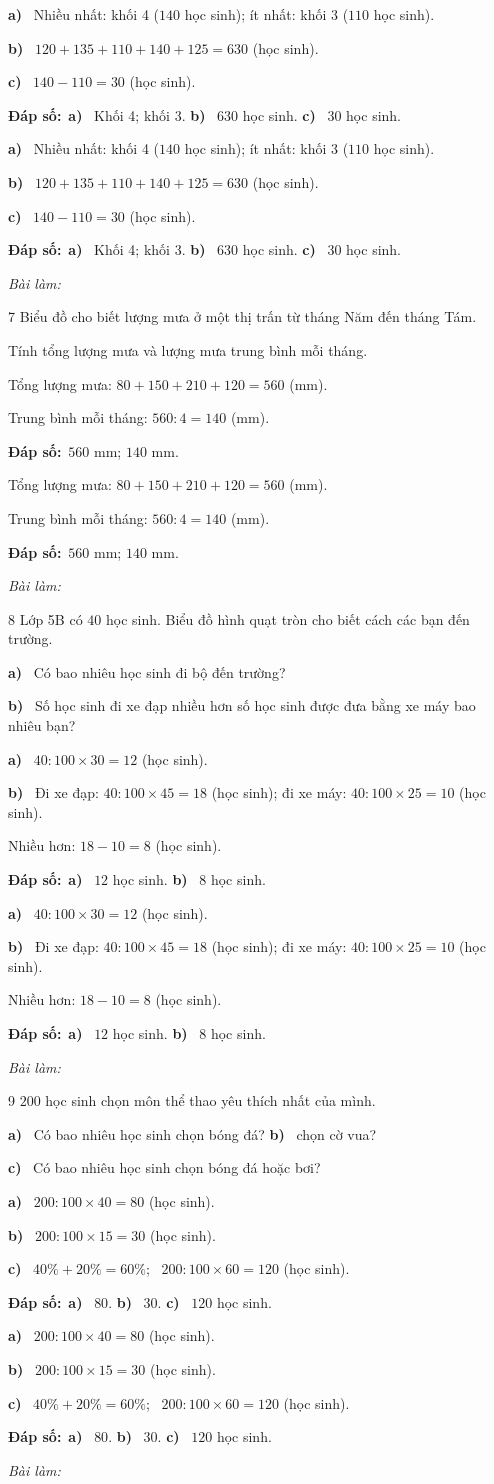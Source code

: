 \documentclass[11pt]{article}
\newif\ifsol \soltrue
\providecommand{\AnsWord}{Đáp số}
\newcommand{\dapso}[1]{\par\textbf{\AnsWord:}\ #1}
\newcommand{\probsol}[1]{%
  \begin{lrbox}{\solmeasure}\begin{minipage}{\dimexpr\linewidth-24pt\relax}#1\end{minipage}\end{lrbox}%
  \ifsol
    \begin{solbox}#1\end{solbox}%
  \else
    \setlength{\solht}{\dimexpr\ht\solmeasure+\dp\solmeasure+0.85cm\relax}%
    \ifdim\solht<1.35cm\setlength{\solht}{1.35cm}\fi
    \begin{tcolorbox}[colback=white,colframe=Line,boxrule=0.8pt,arc=5pt,
      left=8pt,right=8pt,top=4pt,bottom=4pt,height=\solht]{\footnotesize\color{Slate}\itshape\WorkWord}\end{tcolorbox}%
  \fi}
\newcommand{\pa}[1]{\textbf{#1)}\ }
\newcommand{\gap}{\vspace{0.3cm}}
\def\WorkWord{Bài làm:}
\def\AnsWord{Đáp số}
\begin{document}
\probsol{
\pa{a} Nhiều nhất: khối 4 ($140$ học sinh); ít nhất: khối 3 ($110$ học sinh).\par
\pa{b} $120+135+110+140+125=630$ (học sinh).\par
\pa{c} $140-110=30$ (học sinh).
\dapso{\pa{a} Khối 4; khối 3. \pa{b} $630$ học sinh. \pa{c} $30$ học sinh.}}
\gap
\needspace{8.5cm}
\begin{probbox}{7}{\relax}
Biểu đồ cho biết lượng mưa ở một thị trấn từ tháng Năm đến tháng Tám.
\begin{center}
\end{center}
Tính tổng lượng mưa và lượng mưa trung bình mỗi tháng.
\end{probbox}
\probsol{
Tổng lượng mưa: $80+150+210+120=560$ (mm).\par Trung bình mỗi tháng: $560:4=140$ (mm).
\dapso{$560$ mm; $140$ mm.}}
\gap
\needspace{7.5cm}
\begin{probbox}{8}{\relax}
Lớp 5B có $40$ học sinh. Biểu đồ hình quạt tròn cho biết cách các bạn đến trường.
\begin{center}
\end{center}
\pa{a} Có bao nhiêu học sinh đi bộ đến trường?\par
\pa{b} Số học sinh đi xe đạp nhiều hơn số học sinh được đưa bằng xe máy bao nhiêu bạn?
\end{probbox}
\probsol{
\pa{a} $40:100\times30=12$ (học sinh).\par
\pa{b} Đi xe đạp: $40:100\times45=18$ (học sinh); đi xe máy: $40:100\times25=10$ (học sinh).\par Nhiều hơn: $18-10=8$ (học sinh).
\dapso{\pa{a} $12$ học sinh. \pa{b} $8$ học sinh.}}
\gap
\needspace{7.5cm}
\begin{probbox}{9}{\relax}
$200$ học sinh chọn môn thể thao yêu thích nhất của mình.
\begin{center}
\end{center}
\pa{a} Có bao nhiêu học sinh chọn bóng đá? \quad \pa{b} chọn cờ vua?\par
\pa{c} Có bao nhiêu học sinh chọn bóng đá hoặc bơi?
\end{probbox}
\probsol{
\pa{a} $200:100\times40=80$ (học sinh).\par
\pa{b} $200:100\times15=30$ (học sinh).\par
\pa{c} $40\%+20\%=60\%$; \ $200:100\times60=120$ (học sinh).
\dapso{\pa{a} $80$. \pa{b} $30$. \pa{c} $120$ học sinh.}}
\end{document}
